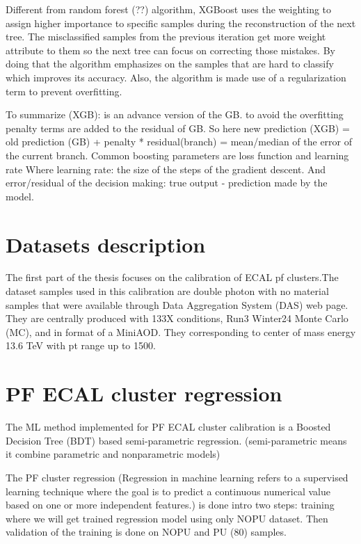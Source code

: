 Different from random forest (??) algorithm, XGBoost uses the weighting to assign higher importance to specific samples during the reconstruction of the next tree. The misclassified samples from the previous iteration get more weight attribute to them so the next tree can focus on correcting those mistakes. By doing that the algorithm emphasizes on the samples that are hard to classify which improves its accuracy.  Also, the algorithm is made use of a regularization term to prevent overfitting.

To summarize (XGB): is an advance version of the GB. to avoid the overfitting penalty terms are added to the residual of GB. So here new prediction (XGB) = old prediction (GB) + penalty * residual(branch) = mean/median of the error of the current branch. Common boosting parameters are loss function and learning rate Where learning rate: the size of the steps of the gradient descent. And error/residual of the decision making: true output - prediction made by the model. 

\section{Datasets description}

The first part of the thesis focuses on the calibration of ECAL pf clusters.The dataset samples used in this calibration are double photon with no material samples that were available through Data Aggregation System (DAS) web page.   
They are centrally produced with 133X %
conditions, Run3 Winter24 Monte Carlo (MC), and in format of a MiniAOD. They corresponding to center of mass energy 13.6 TeV with pt range up to 1500.  


\section{PF ECAL cluster regression}
The ML method implemented for PF ECAL cluster calibration is a Boosted Decision Tree (BDT) based semi-parametric regression. (semi-parametric means it combine parametric and nonparametric models) %

The PF cluster regression (Regression in machine learning refers to a supervised learning technique where the goal is to predict a continuous numerical value based on one or more independent features.) %
is done intro two steps: training where we will get trained regression model using only NOPU dataset. Then validation of the training is done on NOPU and PU (80) samples.


